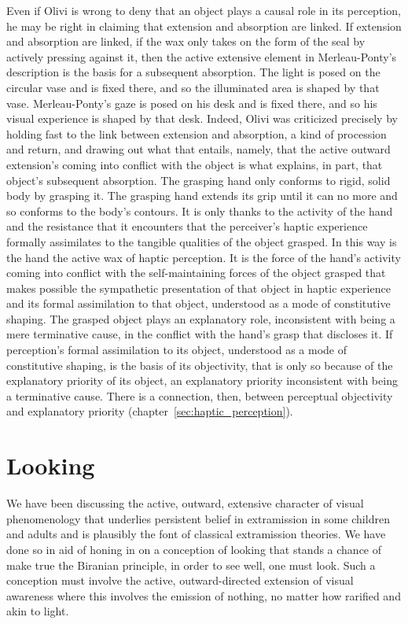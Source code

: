 Even if Olivi is wrong to deny that an object plays a causal role in its perception, he may be right in claiming that extension and absorption are linked. If extension and absorption are linked, if the wax only takes on the form of the seal by actively pressing against it, then the active extensive element in Merleau-Ponty's description is the basis for a subsequent absorption. The light is posed on the circular vase and is fixed there, and so the illuminated area is shaped by that vase. Merleau-Ponty's gaze is posed on his desk and is fixed there, and so his visual experience is shaped by that desk. Indeed, Olivi was criticized precisely by holding fast to the link between extension and absorption, a kind of procession and return, and drawing out what that entails, namely, that the active outward extension's coming into conflict with the object is what explains, in part, that object's subsequent absorption. The grasping hand only conforms to rigid, solid body by grasping it. The grasping hand extends its grip until it can no more and so conforms to the body's contours. It is only thanks to the activity of the hand and the resistance that it encounters that the perceiver's haptic experience formally assimilates to the tangible qualities of the object grasped. In this way is the hand the active wax of haptic perception. It is the force of the hand's activity coming into conflict with the self-maintaining forces of the object grasped that makes possible the sympathetic presentation of that object in haptic experience and its formal assimilation to that object, understood as a mode of constitutive shaping. The grasped object plays an explanatory role, inconsistent with being a mere terminative cause, in the conflict with the hand's grasp that discloses it. If perception's formal assimilation to its object, understood as a mode of constitutive shaping, is the basis of its objectivity, that is only so because of the explanatory priority of its object, an explanatory priority inconsistent with being a terminative cause. There is a connection, then, between perceptual objectivity and explanatory priority (chapter~\ref{sec:haptic_perception}).


\section{Looking} %
\label{sec:looking}

We have been discussing the active, outward, extensive character of visual phenomenology that underlies persistent belief in extramission in some children and adults and is plausibly the font of classical extramission theories. We have done so in aid of honing in on a conception of looking that stands a chance of make true the Biranian principle, in order to see well, one must look. Such a conception must involve the active, outward-directed extension of visual awareness where this involves the emission of nothing, no matter how rarified and akin to light. 

